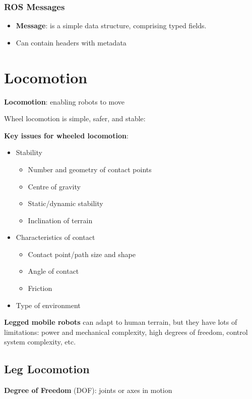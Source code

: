 \documentclass[13pt]{article}
\begin{document}
\subsubsection{ROS Messages}%
\noindent
\begin{itemize}
	\item \textbf{Message}: is a simple data structure, comprising typed fields.
	\item Can contain headers with metadata
\end{itemize}

\section{Locomotion}%
\noindent
\textbf{Locomotion}: enabling robots to move

\hfill

\noindent
Wheel locomotion is simple, safer, and stable:

\hfill

\noindent
\textbf{Key issues for wheeled locomotion}:
\begin{itemize}
	\item Stability
	\begin{itemize}
		\item Number and geometry of contact points
		\item Centre of gravity
		\item Static/dynamic stability
		\item Inclination of terrain
	\end{itemize}
	\item Characteristics of contact
	\begin{itemize}
		\item Contact point/path size and shape
		\item Angle of contact
		\item Friction
	\end{itemize}
	\item Type of environment
\end{itemize}

\hfill

\noindent
\textbf{Legged mobile robots} can adapt to human terrain, but they have lots of limitations: power and mechanical complexity,
high degrees of freedom, control system complexity, etc.

\subsection{Leg Locomotion}%
\noindent
\textbf{Degree of Freedom} (DOF): joints or axes in motion
\end{document}
